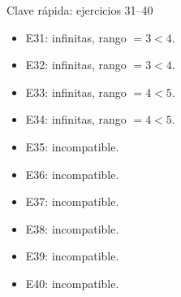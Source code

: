 \documentclass[aspectratio=169,9pt]{beamer}
\theoremstyle{remark}
\begin{document}
\begin{frame}[t]{Clave rápida: ejercicios 31--40}\begin{itemize}
\item E31: infinitas, rango \(=3<4\).
\item E32: infinitas, rango \(=3<4\).
\item E33: infinitas, rango \(=4<5\).
\item E34: infinitas, rango \(=4<5\).
\item E35: incompatible.
\item E36: incompatible.
\item E37: incompatible.
\item E38: incompatible.
\item E39: incompatible.
\item E40: incompatible.
\end{itemize}\end{frame}
\end{document}
